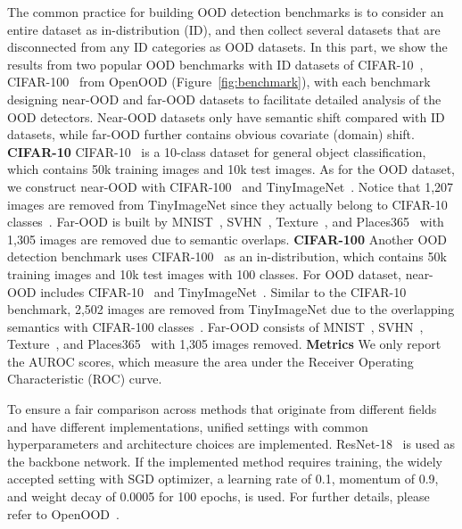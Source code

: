 \label{sec:exp_metrics}
The common practice for building OOD detection benchmarks is to consider an entire dataset as in-distribution (ID), and then collect several datasets that are disconnected from any ID categories as OOD datasets. In this part, we show the results from two popular OOD benchmarks with ID datasets of CIFAR-10~, CIFAR-100~ from OpenOOD (\cf Figure~\ref{fig:benchmark}), with each benchmark designing near-OOD and far-OOD datasets to facilitate detailed analysis of the OOD detectors. Near-OOD datasets only have semantic shift compared with ID datasets, while far-OOD further contains obvious covariate (domain) shift.
\noindent\textbf{CIFAR-10}\qquad
CIFAR-10~ is a 10-class dataset for general object classification, which contains 50k training images and 10k test images. As for the OOD dataset, we construct near-OOD with CIFAR-100~ and TinyImageNet~.
Notice that 1,207 images are removed from TinyImageNet since they actually belong to CIFAR-10 classes~.
Far-OOD is built by MNIST~, SVHN~, Texture~, and Places365~ with 1,305 images are removed due to semantic overlaps.
\noindent\textbf{CIFAR-100}\qquad
Another OOD detection benchmark uses CIFAR-100~ as an in-distribution, which contains 50k training images and 10k test images with 100 classes. 
For OOD dataset, near-OOD includes CIFAR-10~ and TinyImageNet~. 
Similar to the CIFAR-10 benchmark, 2,502 images are removed from TinyImageNet due to the overlapping semantics with CIFAR-100 classes~.
Far-OOD consists of MNIST~, SVHN~, Texture~, and Places365~ with 1,305 images removed.
\noindent\textbf{Metrics}\qquad
We only report the AUROC scores, which measure the area under the Receiver Operating Characteristic (ROC) curve.

To ensure a fair comparison across methods that originate from different fields and have different implementations, unified settings with common hyperparameters and architecture choices are implemented. ResNet-18~ is used as the backbone network. If the implemented method requires training, the widely accepted setting with SGD optimizer, a learning rate of 0.1, momentum of 0.9, and weight decay of 0.0005 for 100 epochs, is used. For further details, please refer to OpenOOD~.

